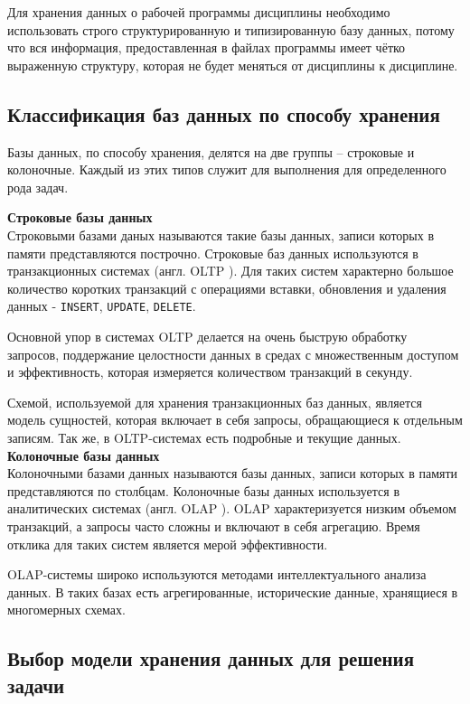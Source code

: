 Для хранения данных о рабочей программы дисциплины необходимо использовать строго структурированную и типизированную базу данных, потому что вся информация, предоставленная в файлах программы имеет чётко выраженную структуру, которая не будет меняться от дисциплины к дисциплине.

\subsection{Классификация баз данных по способу хранения}

Базы данных, по способу хранения, делятся на две группы -- строковые и колоночные. Каждый из этих типов служит для выполнения для определенного рода задач.

\noindent\textbf{Строковые базы данных}\\

Строковыми базами даных называются такие базы данных, записи которых в памяти представляются построчно. Строковые баз данных используются в транзакционных системах (англ. OLTP \cite{OLTP}). Для таких систем характерно большое количество коротких транзакций с операциями вставки, обновления и удаления данных - \texttt{INSERT}, \texttt{UPDATE}, \texttt{DELETE}. 

Основной упор в системах OLTP делается на очень быструю обработку запросов, поддержание целостности данных в средах с множественным доступом и эффективность, которая измеряется количеством транзакций в секунду. 

Схемой, используемой для хранения транзакционных баз данных, является модель сущностей, которая включает в себя запросы, обращающиеся к отдельным записям. Так же, в OLTP-системах есть подробные и текущие данных.\\

\noindent\textbf{Колоночные базы данных}\\

Колоночными базами данных называются базы данных, записи которых в памяти представляются по столбцам. Колоночные базы данных используется в аналитических системах (англ. OLAP \cite{olap}). OLAP характеризуется низким объемом транзакций, а запросы часто сложны и включают в себя агрегацию. Время отклика для таких систем является мерой эффективности.

OLAP-системы широко используются методами интеллектуального анализа данных. В таких базах есть агрегированные, исторические данные, хранящиеся в многомерных схемах. 

\subsection{Выбор модели хранения данных для решения задачи}

